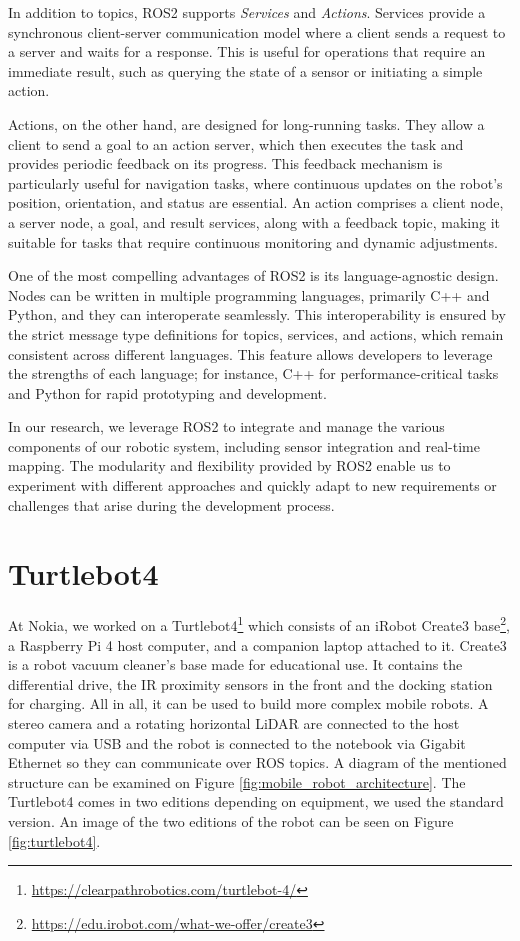 In addition to topics, ROS2 supports \textit{Services} and \textit{Actions}. Services provide a synchronous client-server communication model where a client sends a request to a server and waits for a response. This is useful for operations that require an immediate result, such as querying the state of a sensor or initiating a simple action.

Actions, on the other hand, are designed for long-running tasks. They allow a client to send a goal to an action server, which then executes the task and provides periodic feedback on its progress. This feedback mechanism is particularly useful for navigation tasks, where continuous updates on the robot's position, orientation, and status are essential. An action comprises a client node, a server node, a goal, and result services, along with a feedback topic, making it suitable for tasks that require continuous monitoring and dynamic adjustments.

One of the most compelling advantages of ROS2 is its language-agnostic design. Nodes can be written in multiple programming languages, primarily C++ and Python, and they can interoperate seamlessly. This interoperability is ensured by the strict message type definitions for topics, services, and actions, which remain consistent across different languages. This feature allows developers to leverage the strengths of each language; for instance, C++ for performance-critical tasks and Python for rapid prototyping and development.

In our research, we leverage ROS2 to integrate and manage the various components of our robotic system, including sensor integration and real-time mapping. The modularity and flexibility provided by ROS2 enable us to experiment with different approaches and quickly adapt to new requirements or challenges that arise during the development process.

\section{Turtlebot4}
At Nokia, we worked on a Turtlebot4\footnote{\url{https://clearpathrobotics.com/turtlebot-4/}} which consists of an iRobot Create3 base\footnote{\url{https://edu.irobot.com/what-we-offer/create3}}, a Raspberry Pi 4 host computer, and a companion laptop attached to it. Create3 is a robot vacuum cleaner's base made for educational use. It contains the differential drive, the IR proximity sensors in the front and the docking station for charging. All in all, it can be used to build more complex mobile robots.
A stereo camera and a rotating horizontal LiDAR are connected to the host computer via USB and the robot is connected to the notebook via Gigabit Ethernet so they can communicate over ROS topics. A diagram of the mentioned structure can be examined on Figure \ref{fig:mobile_robot_architecture}. The Turtlebot4 comes in two editions depending on equipment, we used the standard version. An image of the two editions of the robot can be seen on Figure \ref{fig:turtlebot4}.

